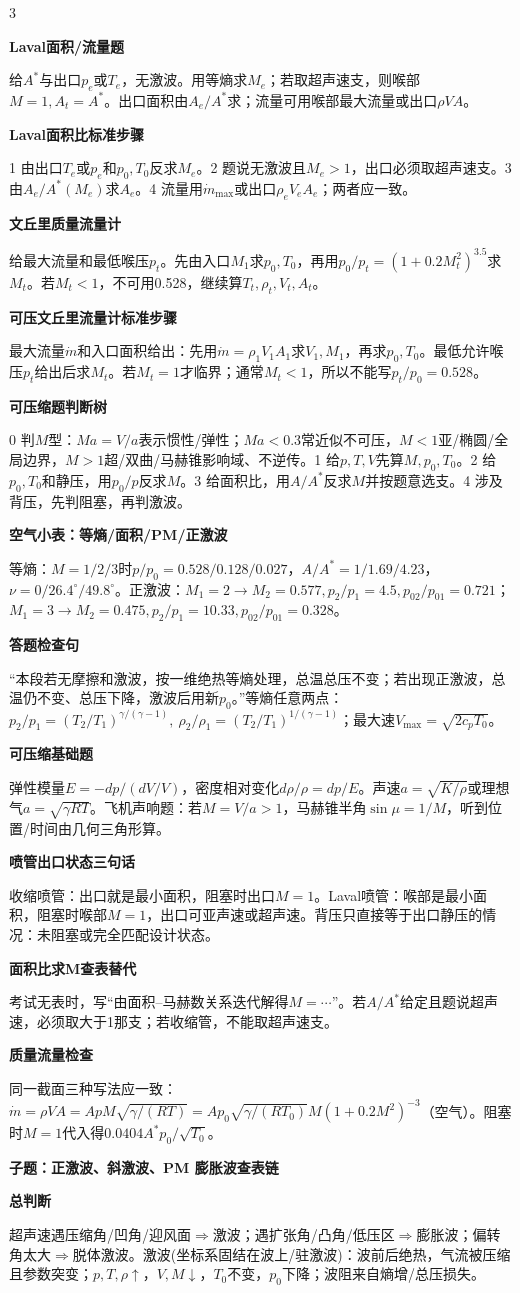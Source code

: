 \documentclass[a4paper]{article}
\newcommand{\qt}[1]{\vspace{0.25pt}\colorbox{Q}{\parbox{\dimexpr\linewidth-2\fboxsep}{\color{white}\bfseries #1}}\par}
\newcommand{\sect}[1]{\qt{#1}}
\newcommand{\schemeshock}{}
\begin{document}
\begin{multicols}{3}
{\sect{Laval面积/流量题}
给$A^*$与出口$p_e$或$T_e$，无激波。用等熵求$M_e$；若取超声速支，则喉部$M=1,A_t=A^*$。出口面积由$A_e/A^*$求；流量可用喉部最大流量或出口$\rho VA$。
\sect{Laval面积比标准步骤}
1 由出口$T_e$或$p_e$和$p_0,T_0$反求$M_e$。2 题说无激波且$M_e>1$，出口必须取超声速支。3 由$A_e/A^*(M_e)$求$A_e$。4 流量用$\dot m_{\max}$或出口$\rho_eV_eA_e$；两者应一致。

\sect{文丘里质量流量计}
给最大流量和最低喉压$p_t$。先由入口$M_1$求$p_0,T_0$，再用$p_0/p_t=(1+0.2M_t^2)^{3.5}$求$M_t$。若$M_t<1$，不可用0.528，继续算$T_t,\rho_t,V_t,A_t$。
\sect{可压文丘里流量计标准步骤}
最大流量$\dot m$和入口面积给出：先用$\dot m=\rho_1V_1A_1$求$V_1,M_1$，再求$p_0,T_0$。最低允许喉压$p_t$给出后求$M_t$。若$M_t=1$才临界；通常$M_t<1$，所以不能写$p_t/p_0=0.528$。
\sect{可压缩题判断树}
0 判$M$型：$Ma=V/a$表示惯性/弹性；$Ma<0.3$常近似不可压，$M<1$亚/椭圆/全局边界，$M>1$超/双曲/马赫锥影响域、不逆传。1 给$p,T,V$先算$M,p_0,T_0$。2 给$p_0,T_0$和静压，用$p_0/p$反求$M$。3 给面积比，用$A/A^*$反求$M$并按题意选支。4 涉及背压，先判阻塞，再判激波。
\sect{空气小表：等熵/面积/PM/正激波}
等熵：$M=1/2/3$时$p/p_0=0.528/0.128/0.027$，$A/A^*=1/1.69/4.23$，$\nu=0/26.4^\circ/49.8^\circ$。正激波：$M_1=2\to M_2=0.577,p_2/p_1=4.5,p_{02}/p_{01}=0.721$；$M_1=3\to M_2=0.475,p_2/p_1=10.33,p_{02}/p_{01}=0.328$。
\sect{答题检查句}
“本段若无摩擦和激波，按一维绝热等熵处理，总温总压不变；若出现正激波，总温仍不变、总压下降，激波后用新$p_0$。”等熵任意两点：$p_2/p_1=(T_2/T_1)^{\gamma/(\gamma-1)},\ \rho_2/\rho_1=(T_2/T_1)^{1/(\gamma-1)}$；最大速$V_{\max}=\sqrt{2c_pT_0}$。
\sect{可压缩基础题}
弹性模量$E=-dp/(dV/V)$，密度相对变化$d\rho/\rho=dp/E$。声速$a=\sqrt{K/\rho}$或理想气$a=\sqrt{\gamma RT}$。飞机声响题：若$M=V/a>1$，马赫锥半角$\sin\mu=1/M$，听到位置/时间由几何三角形算。
\sect{喷管出口状态三句话}
收缩喷管：出口就是最小面积，阻塞时出口$M=1$。Laval喷管：喉部是最小面积，阻塞时喉部$M=1$，出口可亚声速或超声速。背压只直接等于出口静压的情况：未阻塞或完全匹配设计状态。
\sect{面积比求M查表替代}
考试无表时，写“由面积--马赫数关系迭代解得$M=\cdots$”。若$A/A^*$给定且题说超声速，必须取大于1那支；若收缩管，不能取超声速支。
\sect{质量流量检查}
同一截面三种写法应一致：$\dot m=\rho VA=ApM\sqrt{\gamma/(RT)}=A p_0\sqrt{\gamma/(RT_0)}M(1+0.2M^2)^{-3}$（空气）。阻塞时$M=1$代入得$0.0404A^*p_0/\sqrt{T_0}$。
}

\qt{子题：正激波、斜激波、PM 膨胀波查表链}
{\fontsize{2.66}{2.82}\selectfont
\schemeshock
\sect{总判断}
超声速遇压缩角/凹角/迎风面$\Rightarrow$激波；遇扩张角/凸角/低压区$\Rightarrow$膨胀波；偏转角太大$\Rightarrow$脱体激波。激波(坐标系固结在波上/驻激波)：波前后绝热，气流被压缩且参数突变；$p,T,\rho\uparrow$，$V,M\downarrow$，$T_0$不变，$p_0$下降；波阻来自熵增/总压损失。

}
\end{multicols}
\end{document}
